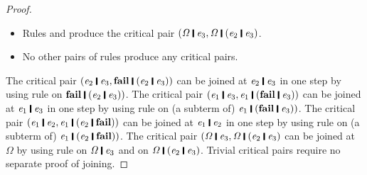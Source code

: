 \begin{proof}
\begin{itemize}
\item  Rules  and  produce the critical pair \ensuremath{(\mathit{\Omega}\;\rule[-0.1em]{0.15em}{0.75em}\;\Varid{e}_{\mathrm{3}},\mathit{\Omega}\;\rule[-0.1em]{0.15em}{0.75em}\;(\Varid{e}_{\mathrm{2}}\;\rule[-0.1em]{0.15em}{0.75em}\;\Varid{e}_{\mathrm{3}})}.

\item  No other pairs of rules produce any critical pairs.
\end{itemize}
The critical pair \ensuremath{(\Varid{e}_{\mathrm{2}}\;\rule[-0.1em]{0.15em}{0.75em}\;\Varid{e}_{\mathrm{3}},\textbf{fail}\;\rule[-0.1em]{0.15em}{0.75em}\;(\Varid{e}_{\mathrm{2}}\;\rule[-0.1em]{0.15em}{0.75em}\;\Varid{e}_{\mathrm{3}}))} can be joined at \ensuremath{\Varid{e}_{\mathrm{2}}\;\rule[-0.1em]{0.15em}{0.75em}\;\Varid{e}_{\mathrm{3}}} in one step by using rule  on \ensuremath{\textbf{fail}\;\rule[-0.1em]{0.15em}{0.75em}\;(\Varid{e}_{\mathrm{2}}\;\rule[-0.1em]{0.15em}{0.75em}\;\Varid{e}_{\mathrm{3}}))}. 
The critical pair \ensuremath{(\Varid{e}_{\mathrm{1}}\;\rule[-0.1em]{0.15em}{0.75em}\;\Varid{e}_{\mathrm{3}},\Varid{e}_{\mathrm{1}}\;\rule[-0.1em]{0.15em}{0.75em}\;(\textbf{fail}\;\rule[-0.1em]{0.15em}{0.75em}\;\Varid{e}_{\mathrm{3}}))} can be joined at \ensuremath{\Varid{e}_{\mathrm{1}}\;\rule[-0.1em]{0.15em}{0.75em}\;\Varid{e}_{\mathrm{3}}} in one step by using rule  on (a subterm of) \ensuremath{\Varid{e}_{\mathrm{1}}\;\rule[-0.1em]{0.15em}{0.75em}\;(\textbf{fail}\;\rule[-0.1em]{0.15em}{0.75em}\;\Varid{e}_{\mathrm{3}}))}. 
The critical pair \ensuremath{(\Varid{e}_{\mathrm{1}}\;\rule[-0.1em]{0.15em}{0.75em}\;\Varid{e}_{\mathrm{2}},\Varid{e}_{\mathrm{1}}\;\rule[-0.1em]{0.15em}{0.75em}\;(\Varid{e}_{\mathrm{2}}\;\rule[-0.1em]{0.15em}{0.75em}\;\textbf{fail}))} can be joined at \ensuremath{\Varid{e}_{\mathrm{1}}\;\rule[-0.1em]{0.15em}{0.75em}\;\Varid{e}_{\mathrm{2}}} in one step by using rule  on (a subterm of) \ensuremath{\Varid{e}_{\mathrm{1}}\;\rule[-0.1em]{0.15em}{0.75em}\;(\Varid{e}_{\mathrm{2}}\;\rule[-0.1em]{0.15em}{0.75em}\;\textbf{fail}))}. 
The critical pair \ensuremath{(\mathit{\Omega}\;\rule[-0.1em]{0.15em}{0.75em}\;\Varid{e}_{\mathrm{3}},\mathit{\Omega}\;\rule[-0.1em]{0.15em}{0.75em}\;(\Varid{e}_{\mathrm{2}}\;\rule[-0.1em]{0.15em}{0.75em}\;\Varid{e}_{\mathrm{3}})} can be joined at \ensuremath{\mathit{\Omega}} by using rule  on \ensuremath{\mathit{\Omega}\;\rule[-0.1em]{0.15em}{0.75em}\;\Varid{e}_{\mathrm{3}}} and on \ensuremath{\mathit{\Omega}\;\rule[-0.1em]{0.15em}{0.75em}\;(\Varid{e}_{\mathrm{2}}\;\rule[-0.1em]{0.15em}{0.75em}\;\Varid{e}_{\mathrm{3}})}.
Trivial critical pairs require no separate proof of joining.


\end{proof}
